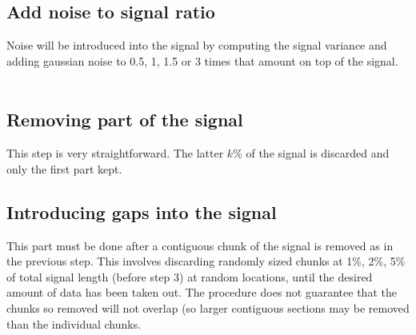 		\subsection{Add noise to signal ratio}
		Noise will be introduced into the signal by computing the signal variance and adding gaussian noise to 0.5, 1, 1.5 or 3 times that amount on top of the signal. \\ \\
		
		\subsection{Removing part of the signal}
		This step is very straightforward. The latter $k\%$ of the signal is discarded and only the first part kept.
		
		\subsection{Introducing gaps into the signal}
		This part must be done after a contiguous chunk of the signal is removed as in the previous step. This involves discarding randomly sized chunks at 1\%, 2\%, 5\% of total signal length (before step 3) at random locations, until the desired amount of data has been taken out. The procedure does not guarantee that the chunks so removed will not overlap (so larger contiguous sections may be removed than the individual chunks.  %
		
%
